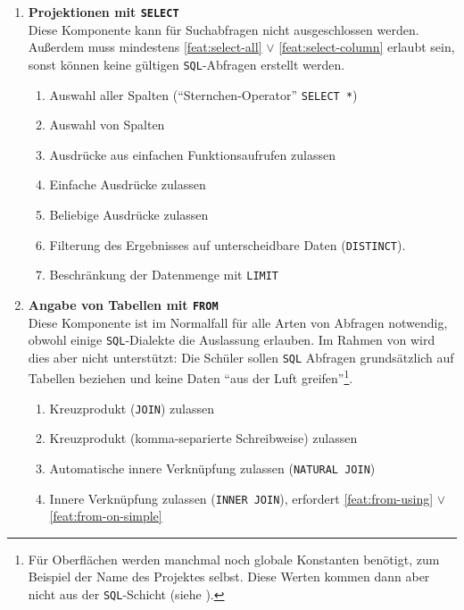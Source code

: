 \begin{enumerate}
\item \textbf{Projektionen mit \texttt{SELECT}} \\
  Diese Komponente kann für Suchabfragen nicht ausgeschlossen werden. Außerdem muss mindestens \ref{feat:select-all} $\lor$ \ref{feat:select-column} erlaubt sein, sonst können keine gültigen \texttt{SQL}-Abfragen erstellt werden.
  \begin{enumerate}[noitemsep]
  \item \label{feat:select-all} Auswahl aller Spalten ("`Sternchen-Operator"' \texttt{SELECT *})
  \item \label{feat:select-column} Auswahl von Spalten
  \item \label{feat:select-single-function} Ausdrücke aus einfachen Funktionsaufrufen zulassen
  \item \label{feat:select-simple-expression} Einfache Ausdrücke zulassen
  \item \label{feat:select-expression} Beliebige Ausdrücke zulassen
  \item \label{feat:select-distinct} Filterung des Ergebnisses auf unterscheidbare Daten (\texttt{DISTINCT}).
  \item \label{feat:select-limit} Beschränkung der Datenmenge mit \texttt{LIMIT}
  \end{enumerate}
\item \textbf{Angabe von Tabellen mit \texttt{FROM}} \\
  Diese Komponente ist im Normalfall für alle Arten von Abfragen notwendig, obwohl einige \texttt{SQL}-Dialekte die Auslassung erlauben. Im Rahmen von \idename{} wird dies aber nicht unterstützt: Die Schüler sollen \texttt{SQL} Abfragen grundsätzlich auf Tabellen beziehen und keine Daten "`aus der Luft greifen"'\footnote{Für Oberflächen werden manchmal noch globale Konstanten benötigt, zum Beispiel der Name des Projektes selbst. Diese Werten kommen dann aber nicht aus der \texttt{SQL}-Schicht (siehe ).}.
  \begin{enumerate}[noitemsep]
  \item \label{feat:from-cross-join} Kreuzprodukt (\texttt{JOIN}) zulassen
  \item \label{feat:from-cross-comma} Kreuzprodukt (komma-separierte Schreibweise) zulassen
  \item \label{feat:from-natural-join} Automatische innere Verknüpfung zulassen (\texttt{NATURAL JOIN})
  \item \label{feat:from-inner-join} Innere Verknüpfung zulassen (\texttt{INNER JOIN}), erfordert \ref{feat:from-using} $\lor$ \ref{feat:from-on-simple}

\end{enumerate}
\end{enumerate}
